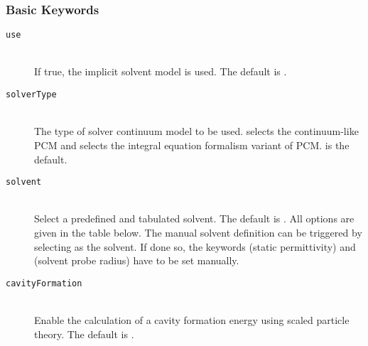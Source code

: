 \subsubsection{Basic Keywords}
\begin{description}
  \item [\texttt{use}]\hfill \\
  If true, the implicit solvent model is used. The default is .
 \item [\texttt{solverType}]\hfill \\
 The type of solver continuum model to be used.  selects the continuum-like PCM and 
  selects the integral equation formalism variant of PCM.  is the default.
 \item [\texttt{solvent}]\hfill \\
 Select a predefined and tabulated solvent. The default is . All options are given in the table below.
 The manual solvent definition can be triggered by selecting  as the solvent. If done so, the keywords 
  (static permittivity) and  (solvent probe radius) have to be set manually.
 \item [\texttt{cavityFormation}]\hfill \\
 Enable the calculation of a cavity formation energy using scaled particle theory. The default
 is .
\end{description}
